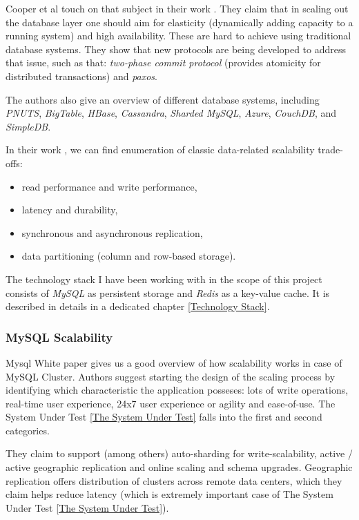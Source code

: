 \documentclass{uvamscse}
\begin{document}
Cooper et al touch on that subject in their work \cite{Ycsb}. They claim that in scaling out the database layer one should aim for elasticity (dynamically adding capacity to a running system) and high availability. These are hard to achieve using traditional database systems. They show that new protocols are being developed to address that issue, such as that: \textit{two-phase commit protocol} (provides atomicity for distributed transactions) and \textit{paxos}.


The authors \cite{Ycsb} also give an overview of different database systems, including \textit{PNUTS}, \textit{BigTable}, \textit{HBase}, \textit{Cassandra}, \textit{Sharded MySQL}, \textit{Azure}, \textit{CouchDB}, and \textit{SimpleDB}.


In their work \cite{Ycsb}, we can find enumeration of classic data-related scalability trade-offs:
\begin{itemize}
    \item read performance and write performance,
    \item latency and durability,
    \item synchronous and asynchronous replication,
    \item data partitioning (column and row-based storage).
  \end{itemize}


The technology stack I have been working with in the scope of this project consists of \textit{MySQL} as persistent storage and \textit{Redis} as a key-value cache. It is described in details in a dedicated chapter \ref{Technology Stack}.

\subsubsection{MySQL Scalability}

Mysql White paper \cite{MySQL} gives us a good overview of how scalability works in case of MySQL Cluster. Authors suggest starting the design of the scaling process by identifying which characteristic the application posseses: lots of write operations, real-time user experience, 24x7 user experience or agility and ease-of-use. The System Under Test \ref{The System Under Test} falls into the first and second categories.

They claim to support (among others) auto-sharding for write-scalability, active / active geographic replication and online scaling and schema upgrades.  Geographic replication offers distribution of clusters across remote data centers, which they claim helps reduce latency (which is extremely important case of The System Under Test \ref{The System Under Test}).
\end{document}
